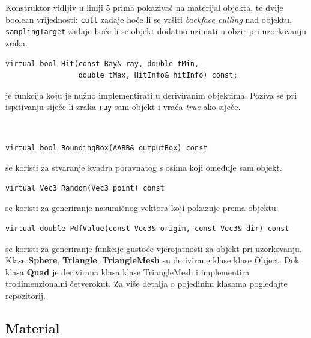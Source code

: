 \documentclass[
12pt, %
oneside, %
english, %
singlespacing, %
parskip, %
headsepline, %
chapterinoneline, %
consistentlayout, %
]{MastersDoctoralThesis} %
\begin{document}
Konstruktor vidljiv u liniji 5 prima pokazivač na materijal objekta, te dvije boolean vrijednosti: 
\texttt{cull} zadaje hoće li se vršiti \emph{backface culling} nad objektu, 
\texttt{samplingTarget} zadaje hoće li se objekt dodatno uzimati u obzir pri uzorkovanju zraka.

\begin{minipage}{\textwidth}
\begin{verbatim}
virtual bool Hit(const Ray& ray, double tMin, 
                 double tMax, HitInfo& hitInfo) const;
\end{verbatim}

je funkcija koju je nužno implementirati u deriviranim
objektima. Poziva se pri ispitivanju siječe li zraka \texttt{ray} sam objekt i vraća \emph{true}
ako siječe.
\end{minipage}
\\

\begin{verbatim}
virtual bool BoundingBox(AABB& outputBox) const
\end{verbatim}
se koristi za stvaranje kvadra poravnatog s osima koji omeđuje sam objekt.
\\

\begin{verbatim}
virtual Vec3 Random(Vec3 point) const
\end{verbatim}
se koristi za generiranje nasumičnog vektora koji pokazuje prema objektu.
\\

\begin{verbatim}
virtual double PdfValue(const Vec3& origin, const Vec3& dir) const
\end{verbatim}
se koristi za generiranje funkcije gustoće vjerojatnosti za objekt pri uzorkovanju.
\\

Klase \textbf{Sphere}, \textbf{Triangle}, \textbf{TriangleMesh} su derivirane klase klase Object.
Dok klasa \textbf{Quad} je derivirana klasa klase TriangleMesh i implementira trodimenzionalni
četverokut. Za više detalja o pojedinim klasama pogledajte repozitorij.

\vspace*{2cm}

\subsection*{Material}
\end{document}
